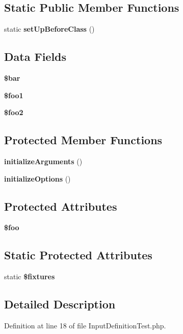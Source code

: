 \subsection*{Static Public Member Functions}
\begin{DoxyCompactItemize}
\item 
static {\bf set\+Up\+Before\+Class} ()
\end{DoxyCompactItemize}
\subsection*{Data Fields}
\begin{DoxyCompactItemize}
\item 
{\bf \$bar}
\item 
{\bf \$foo1}
\item 
{\bf \$foo2}
\end{DoxyCompactItemize}
\subsection*{Protected Member Functions}
\begin{DoxyCompactItemize}
\item 
{\bf initialize\+Arguments} ()
\item 
{\bf initialize\+Options} ()
\end{DoxyCompactItemize}
\subsection*{Protected Attributes}
\begin{DoxyCompactItemize}
\item 
{\bf \$foo}
\end{DoxyCompactItemize}
\subsection*{Static Protected Attributes}
\begin{DoxyCompactItemize}
\item 
static {\bf \$fixtures}
\end{DoxyCompactItemize}


\subsection{Detailed Description}


Definition at line 18 of file Input\+Definition\+Test.\+php.



